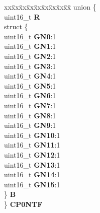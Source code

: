 \begin{DoxyCompactItemize}
\begin{tabbing}
\end{tabbing}\item 
\mbox{\label{structSEMA4__tag_af86c4aa5648f300bbc4e8ee5c2f38a69}} 
\begin{tabbing}
xx\=xx\=xx\=xx\=xx\=xx\=xx\=xx\=xx\=\kill
union \{\\
\>uint16\_t {\bfseries R}\\
\>struct \{\\
\>\>uint16\_t {\bfseries GN0}:1\\
\>\>uint16\_t {\bfseries GN1}:1\\
\>\>uint16\_t {\bfseries GN2}:1\\
\>\>uint16\_t {\bfseries GN3}:1\\
\>\>uint16\_t {\bfseries GN4}:1\\
\>\>uint16\_t {\bfseries GN5}:1\\
\>\>uint16\_t {\bfseries GN6}:1\\
\>\>uint16\_t {\bfseries GN7}:1\\
\>\>uint16\_t {\bfseries GN8}:1\\
\>\>uint16\_t {\bfseries GN9}:1\\
\>\>uint16\_t {\bfseries GN10}:1\\
\>\>uint16\_t {\bfseries GN11}:1\\
\>\>uint16\_t {\bfseries GN12}:1\\
\>\>uint16\_t {\bfseries GN13}:1\\
\>\>uint16\_t {\bfseries GN14}:1\\
\>\>uint16\_t {\bfseries GN15}:1\\
\>\} {\bfseries B}\\
\} {\bfseries CP0NTF}\\


\end{tabbing}
\end{DoxyCompactItemize}
